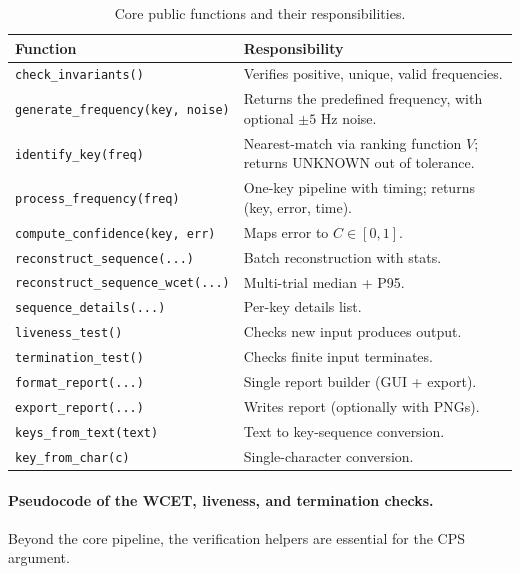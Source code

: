 \documentclass[11pt,a4paper]{article}
\begin{document}
\begin{table}[H]
    \centering
    \begin{tabular}{@{}lp{10cm}@{}}
        \toprule
        \textbf{Function} & \textbf{Responsibility} \\
        \midrule
        \texttt{check\_invariants()} & Verifies positive, unique, valid
            frequencies. \\
        \texttt{generate\_frequency(key, noise)} & Returns the predefined
            frequency, with optional $\pm 5$ Hz noise. \\
        \texttt{identify\_key(freq)} & Nearest-match via ranking function $V$;
            returns UNKNOWN out of tolerance. \\
        \texttt{process\_frequency(freq)} & One-key pipeline with timing;
            returns (key, error, time). \\
        \texttt{compute\_confidence(key, err)} & Maps error to $C \in [0,1]$. \\
        \texttt{reconstruct\_sequence(...)} & Batch reconstruction with
            stats. \\
        \texttt{reconstruct\_sequence\_wcet(...)} & Multi-trial median + P95. \\
        \texttt{sequence\_details(...)} & Per-key details list. \\
        \texttt{liveness\_test()} & Checks new input produces output. \\
        \texttt{termination\_test()} & Checks finite input terminates. \\
        \texttt{format\_report(...)} & Single report builder (GUI + export). \\
        \texttt{export\_report(...)} & Writes report (optionally with PNGs). \\
        \texttt{keys\_from\_text(text)} & Text to key-sequence conversion. \\
        \texttt{key\_from\_char(c)} & Single-character conversion. \\
        \bottomrule
    \end{tabular}
    \caption{Core public functions and their responsibilities.}
    \label{tab:functions}
\end{table}

\paragraph{Pseudocode of the WCET, liveness, and termination checks.}
Beyond the core pipeline, the verification helpers are essential for the CPS
argument.
\end{document}
